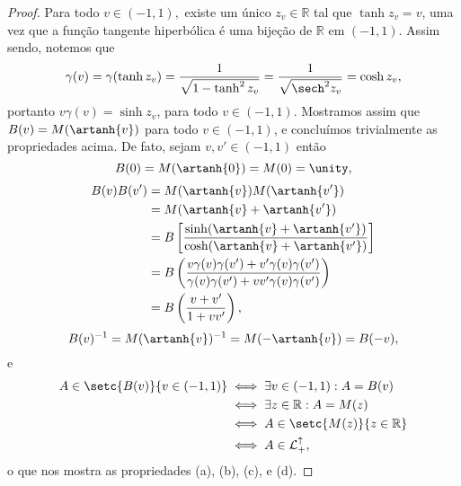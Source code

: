 \begin{proof}
    Para todo \(v \in (-1,1),\) existe um único \(z_v \in \mathbb{R}\) tal que \(\tanh{z_v} = v\), uma vez que a função tangente hiperbólica é uma bijeção de \(\mathbb{R}\) em \((-1,1)\). Assim sendo, notemos que
    \begin{equation*}
        \gamma(v) = \gamma(\tanh{z_v}) = \frac1{\sqrt{1 - \tanh^2{z_v}}} = \frac{1}{\sqrt{\sech^2{z_v}}} = \cosh{z_v},
    \end{equation*}
    portanto \(v \gamma(v) = \sinh{z_v}\), para todo \(v \in (-1,1)\). Mostramos assim que \(B(v) = M(\artanh{v})\) para todo \(v \in (-1,1)\), e concluímos trivialmente as propriedades acima. De fato, sejam \(v, v' \in (-1,1)\) então
    \begin{equation*}
        B(0) = M(\artanh{0}) = M(0) = \unity,
    \end{equation*}
    \begin{align*}
        B(v) B(v') &= M(\artanh{v}) M(\artanh{v'})\\
                   &= M(\artanh{v} + \artanh{v'})\\
                   &= B\left[\frac{\sinh(\artanh{v} + \artanh{v'})}{\cosh(\artanh{v} + \artanh{v'})}\right]\\
                   &= B\left(\frac{v\gamma(v)\gamma(v') + v' \gamma(v) \gamma(v')}{\gamma(v)\gamma(v') + v v' \gamma(v) \gamma(v')}\right)\\
                   &= B\left(\frac{v+v'}{1 + vv'}\right),
    \end{align*}
    \begin{equation*}
        B(v)^{-1} = M(\artanh{v})^{-1} = M(-\artanh{v}) = B(-v),
    \end{equation*}
    e
    \begin{align*}
        A \in \setc{B(v)}{v \in (-1,1)} & \iff \exists v \in (-1,1) : A = B(v)\\
                                        &\iff \exists z \in \mathbb{R} : A = M(z)\\
                                        &\iff A \in \setc{M(z)}{z \in \mathbb{R}}\\
                                        &\iff A \in \mathcal{L}_+^\uparrow,
    \end{align*}
    o que nos mostra as propriedades (a), (b), (c), e (d).
\end{proof}
